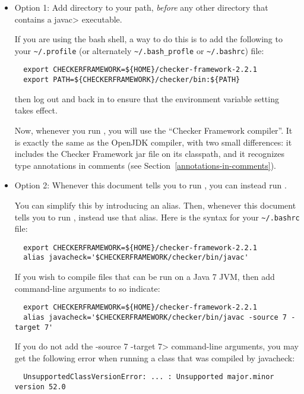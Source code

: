 \begin{itemize}
  \item
    Option 1:
    Add directory
     to your path, \emph{before} any other
    directory that contains a \<javac> executable.

    If you are
    using the bash shell, a way to do this is to add the following to your
    \verb|~/.profile| (or alternately \verb|~/.bash_profle| or \verb|~/.bashrc|) file:
\begin{Verbatim}
  export CHECKERFRAMEWORK=${HOME}/checker-framework-2.2.1
  export PATH=${CHECKERFRAMEWORK}/checker/bin:${PATH}
\end{Verbatim}
    then log out and back in to ensure that the environment variable
    setting takes effect.

    Now, whenever you run , you will use the ``Checker
    Framework compiler''.  It is exactly the same as the OpenJDK compiler,
    with two small differences:  it includes the Checker Framework jar file
    on its classpath, and it recognizes type annotations in comments (see
    Section~\ref{annotations-in-comments}).

  \item
    \begin{sloppypar}
    Option 2:
    Whenever this document tells you to run , you
    can instead run .
    \end{sloppypar}

    You can simplify this by introducing an alias.  Then,
    whenever this document tells you to run , instead use that
    alias.  Here is the syntax for your
    \verb|~/.bashrc| file:
\begin{Verbatim}
  export CHECKERFRAMEWORK=${HOME}/checker-framework-2.2.1
  alias javacheck='$CHECKERFRAMEWORK/checker/bin/javac'
\end{Verbatim}

    If you wish to compile files that can be run on a Java 7 JVM, then add
    command-line arguments to so indicate:

\begin{Verbatim}
  export CHECKERFRAMEWORK=${HOME}/checker-framework-2.2.1
  alias javacheck='$CHECKERFRAMEWORK/checker/bin/javac -source 7 -target 7'
\end{Verbatim}

   If you do not add the \<-source 7 -target 7> command-line arguments, you
   may get the following error when running a class that was compiled by
   javacheck:
\begin{Verbatim}
  UnsupportedClassVersionError: ... : Unsupported major.minor version 52.0
\end{Verbatim}


\end{itemize}

